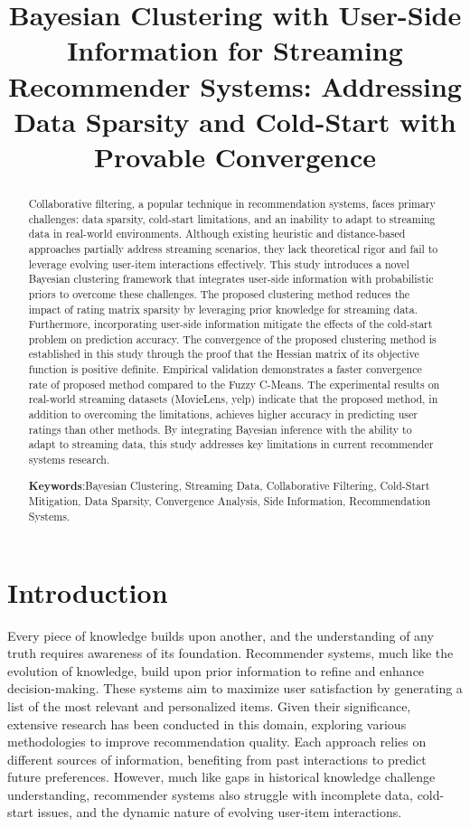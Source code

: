 \documentclass{article}
\title{Bayesian Clustering with User-Side Information for Streaming Recommender Systems: Addressing Data Sparsity and Cold-Start with Provable Convergence}
\author{}
\theoremstyle{plain}
\theoremstyle{definition}
\theoremstyle{remark}
\begin{document}
\maketitle

\begin{abstract}
Collaborative filtering, a popular technique in recommendation systems, faces primary challenges: data sparsity, cold-start limitations, and an inability to adapt to streaming data in real-world environments. Although existing heuristic and distance-based approaches partially address streaming scenarios, they lack theoretical rigor and fail to leverage evolving user-item interactions effectively. This study introduces a novel Bayesian clustering framework that integrates user-side information with probabilistic priors to overcome these challenges. 
The proposed clustering method reduces the impact of rating matrix sparsity by leveraging prior knowledge for streaming data. Furthermore, incorporating user-side information mitigate the effects of the cold-start problem on prediction accuracy.
The convergence of the proposed clustering method is established in this study through the proof that the Hessian matrix of its objective function is positive definite. Empirical validation demonstrates a faster convergence rate of proposed method compared to the Fuzzy C-Means. The experimental results on real-world streaming datasets (MovieLens, yelp) indicate that the proposed method, in addition to overcoming the limitations, achieves higher accuracy in predicting user ratings than other methods. By integrating Bayesian inference with the ability to adapt to streaming data, this study addresses key limitations in current recommender systems research. 

\textbf{Keywords}:Bayesian Clustering, Streaming Data, Collaborative Filtering, Cold-Start Mitigation, Data Sparsity, Convergence Analysis, Side Information, Recommendation Systems.
\end{abstract}

\section{Introduction}
Every piece of knowledge builds upon another, and the understanding of any truth requires awareness of its foundation. 
Recommender systems, much like the evolution of knowledge, build upon prior information to refine and enhance decision-making. These systems aim to maximize user satisfaction by generating a list of the most relevant and personalized items. Given their significance, extensive research has been conducted in this domain, exploring various methodologies to improve recommendation quality. Each approach relies on different sources of information, benefiting from past interactions to predict future preferences. However, much like gaps in historical knowledge challenge understanding, recommender systems also struggle with incomplete data, cold-start issues, and the dynamic nature of evolving user-item interactions.
\end{document}
